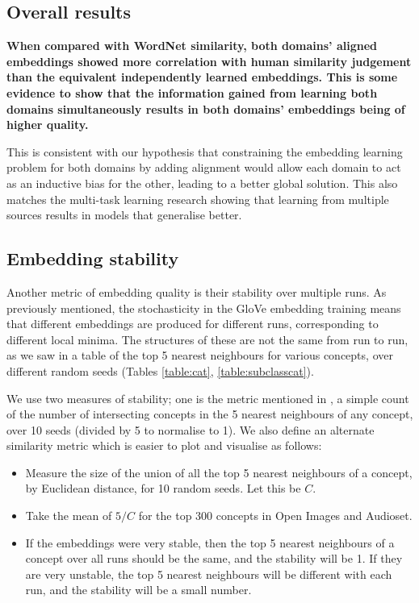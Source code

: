 \subsection{Overall results}
\textbf{When compared with WordNet similarity, both domains' aligned embeddings showed more correlation with human similarity judgement than the equivalent independently learned embeddings. This is some evidence to show that the information gained from learning both domains simultaneously results in both domains' embeddings being of higher quality.} 
 
This is consistent with our hypothesis that constraining the embedding learning problem for both domains by adding alignment would allow each domain to act as an inductive bias for the other, leading to a better global solution. This also matches the multi-task learning research showing that learning from multiple sources results in models that generalise better.


\subsection{Embedding stability}

Another metric of embedding quality is their stability over multiple runs. As previously mentioned, the stochasticity in the GloVe embedding training means that different embeddings are produced for different runs, corresponding to different local minima. The structures of these are not the same from run to run, as we saw in a table of the top 5 nearest neighbours for various concepts, over different random seeds (Tables \ref{table:cat}, \ref{table:subclasscat}). 

We use two measures of stability; one is the metric mentioned in \cite{WordEmbeddingStability}, a simple count of the number of intersecting concepts in the 5 nearest neighbours of any concept, over 10 seeds (divided by 5 to normalise to 1). We also define an alternate similarity metric which is easier to plot and visualise as follows:

\begin{itemize}
    \item Measure the size of the union of all the top 5 nearest neighbours of a concept, by Euclidean distance, for 10 random seeds. Let this be $C$. 
    \item Take the mean of $5/C$ for the top 300 concepts in Open Images and Audioset.
    \item If the embeddings were very stable, then the top 5 nearest neighbours of a concept over all runs should be the same, and the stability will be 1. If they are very unstable, the top 5 nearest neighbours will be different with each run, and the stability will be a small number. 
\end{itemize}

